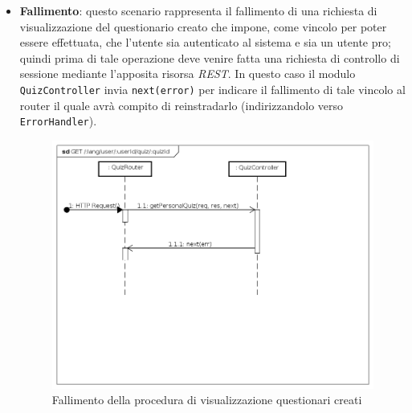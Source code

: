 \begin{itemize}
\item \textbf{Fallimento}: questo scenario rappresenta il fallimento di una richiesta di visualizzazione del questionario creato che impone, come vincolo per poter essere effettuata, che l'utente sia autenticato al sistema e sia un utente pro; quindi prima di tale operazione deve venire fatta una richiesta di controllo di sessione mediante l'apposita risorsa \textit{REST}. In questo caso il modulo \texttt{QuizController} invia \texttt{next(error)} per indicare il fallimento di tale vincolo al router il quale avrà compito di reinstradarlo (indirizzandolo verso \texttt{ErrorHandler}).
\label{Fallimento della procedura di visualizzazione questionario creato}
\begin{figure}[ht]
	\centering
	\includegraphics[scale=0.40]{UML/DiagrammiDiSequenza/Back-end/GET__lang_user_userId_quiz_quizId_failure.png}
	\caption{Fallimento della procedura di visualizzazione questionari creati}
\end{figure}
\FloatBarrier
\end{itemize}



